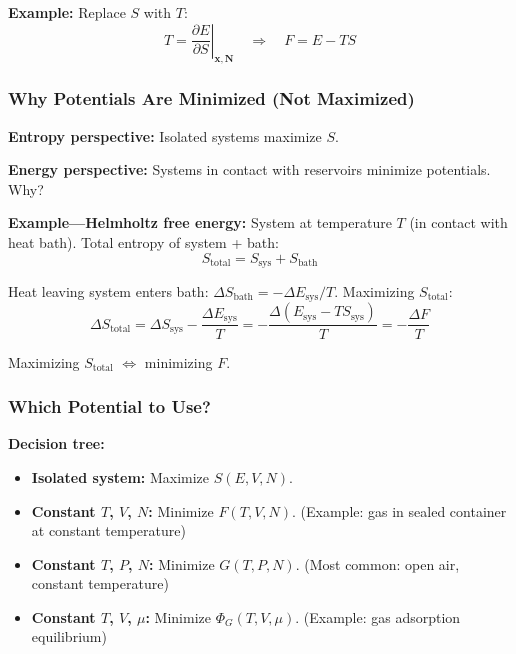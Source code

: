 \documentclass[9pt,twocoloumn]{article}
\begin{document}
\textbf{Example:} Replace $S$ with $T$:
\begin{equation}
T = \left. \frac{\partial E}{\partial S} \right|_{\mathbf{x}, \mathbf{N}} \quad \Rightarrow \quad F = E - TS
\end{equation}

\subsubsection{Why Potentials Are Minimized (Not Maximized)}

\textbf{Entropy perspective:} Isolated systems maximize $S$.

\textbf{Energy perspective:} Systems in contact with reservoirs minimize potentials. Why?

\textbf{Example—Helmholtz free energy:} System at temperature $T$ (in contact with heat bath). Total entropy of system + bath:
\begin{equation}
S_{\text{total}} = S_{\text{sys}} + S_{\text{bath}}
\end{equation}

Heat leaving system enters bath: $\Delta S_{\text{bath}} = -\Delta E_{\text{sys}}/T$. Maximizing $S_{\text{total}}$:
\begin{equation}
\Delta S_{\text{total}} = \Delta S_{\text{sys}} - \frac{\Delta E_{\text{sys}}}{T} = -\frac{\Delta(E_{\text{sys}} - TS_{\text{sys}})}{T} = -\frac{\Delta F}{T}
\end{equation}

Maximizing $S_{\text{total}}$ $\Leftrightarrow$ minimizing $F$.

\subsubsection{Which Potential to Use?}

\textbf{Decision tree:}
\begin{itemize}
    \item \textbf{Isolated system:} Maximize $S(E, V, N)$.
    \item \textbf{Constant $T$, $V$, $N$:} Minimize $F(T, V, N)$. (Example: gas in sealed container at constant temperature)
    \item \textbf{Constant $T$, $P$, $N$:} Minimize $G(T, P, N)$. (Most common: open air, constant temperature)
    \item \textbf{Constant $T$, $V$, $\mu$:} Minimize $\Phi_G(T, V, \mu)$. (Example: gas adsorption equilibrium)
\end{itemize}
\end{document}
